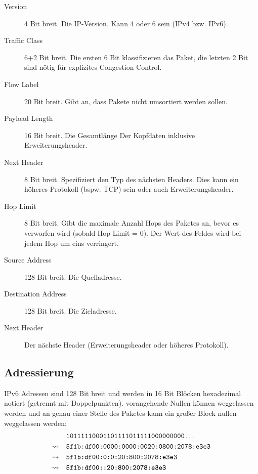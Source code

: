 \documentclass[a4paper, 11pt, accentcolor = tud3b]{tudreport}
\begin{document}
	            \begin{description}
	            	\item[Version] 4 Bit breit. Die IP-Version. Kann 4 oder 6 sein (IPv4 bzw. IPv6).
	            	\item[Traffic Class] 6+2 Bit breit. Die ersten 6 Bit klassifizieren das Paket, die letzten 2 Bit sind nötig für explizites Congestion Control.
	            	\item[Flow Label] 20 Bit breit. Gibt an, dass Pakete nicht umsortiert werden sollen.
	            	\item[Payload Length] 16 Bit breit. Die Gesamtlänge Der Kopfdaten inklusive Erweiterungsheader.
	            	\item[Next Header] 8 Bit breit. Spezifiziert den Typ des nächsten Headers. Dies kann ein höheres Protokoll (bspw. TCP) sein oder auch Erweiterungsheader.
	            	\item[Hop Limit] 8 Bit breit. Gibt die maximale Anzahl Hops des Paketes an, bevor es verworfen wird (sobald Hop Limit = 0). Der Wert des Feldes wird bei jedem Hop um eins verringert.
	            	\item[Source Address] 128 Bit breit. Die Quelladresse.
	            	\item[Destination Address] 128 Bit breit. Die Zieladresse.
	            	\item[Next Header] Der nächste Header (Erweiterungsheader oder höheres Protokoll).
	            \end{description}

            \subsection{Adressierung}
	            IPv6 Adressen sind 128 Bit breit und werden in 16 Bit Blöcken hexadezimal notiert (getrennt mit Doppelpunkten). vorangehende Nullen können weggelassen werden und an genau einer Stelle des Paketes kann ein großer Block nullen weggelassen werden:
	            \begin{align*}
		                             & \quad\texttt{10111110001101111011111000000000}\dots \\
		            \rightsquigarrow & \quad\texttt{5f1b:df00:0000:0000:0020:0800:2078:e3e3} \\
		            \rightsquigarrow & \quad\texttt{5f1b:df00:0:0:20:800:2078:e3e3} \\
		            \rightsquigarrow & \quad\textbf{\texttt{5f1b:df00::20:800:2078:e3e3}}
	            \end{align*}
	            
\end{document}
